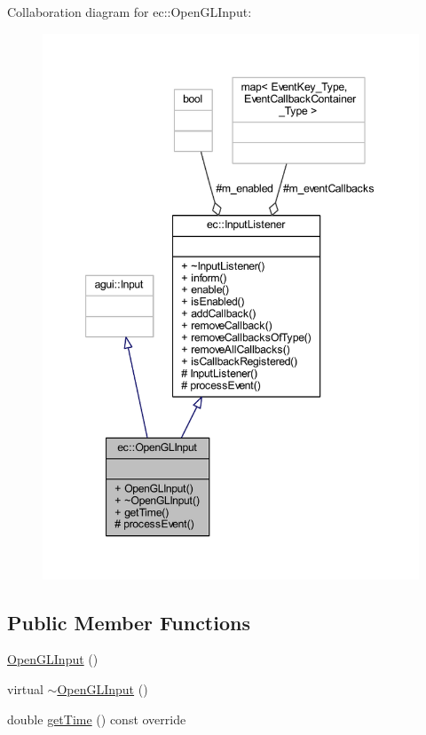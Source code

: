 Collaboration diagram for ec\+:\+:Open\+G\+L\+Input\+:\nopagebreak
\begin{figure}[H]
\begin{center}
\leavevmode
\includegraphics[width=347pt]{classec_1_1_open_g_l_input__coll__graph}
\end{center}
\end{figure}
\subsection*{Public Member Functions}
\begin{DoxyCompactItemize}
\item 
\mbox{\hyperlink{classec_1_1_open_g_l_input_a7046406475d576873c287a64ea4d3cb6}{Open\+G\+L\+Input}} ()
\item 
virtual \mbox{\hyperlink{classec_1_1_open_g_l_input_ab4a3fa6d2e349d8dbf4de8b50a7a81ae}{$\sim$\+Open\+G\+L\+Input}} ()
\item 
double \mbox{\hyperlink{classec_1_1_open_g_l_input_a5a4c1780a904c55d5ac38272234b87a7}{get\+Time}} () const override
\end{DoxyCompactItemize}
